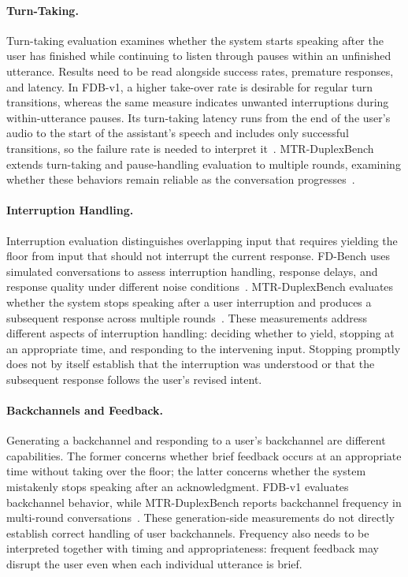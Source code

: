 \paragraph{Turn-Taking.}
Turn-taking evaluation examines whether the system starts speaking after the user has finished while continuing to listen through pauses within an unfinished utterance. Results need to be read alongside success rates, premature responses, and latency. In FDB-v1, a higher take-over rate is desirable for regular turn transitions, whereas the same measure indicates unwanted interruptions during within-utterance pauses. Its turn-taking latency runs from the end of the user's audio to the start of the assistant's speech and includes only successful transitions, so the failure rate is needed to interpret it~\citep{DBLP:conf/asru/LinLLWALL25}. MTR-DuplexBench extends turn-taking and pause-handling evaluation to multiple rounds, examining whether these behaviors remain reliable as the conversation progresses~\citep{DBLP:conf/acl/HeCXLZBMK26}.

\paragraph{Interruption Handling.}
Interruption evaluation distinguishes overlapping input that requires yielding the floor from input that should not interrupt the current response. FD-Bench uses simulated conversations to assess interruption handling, response delays, and response quality under different noise conditions~\citep{DBLP:conf/interspeech/PengCNMN0C25}. MTR-DuplexBench evaluates whether the system stops speaking after a user interruption and produces a subsequent response across multiple rounds~\citep{DBLP:conf/acl/HeCXLZBMK26}. These measurements address different aspects of interruption handling: deciding whether to yield, stopping at an appropriate time, and responding to the intervening input. Stopping promptly does not by itself establish that the interruption was understood or that the subsequent response follows the user's revised intent.

\paragraph{Backchannels and Feedback.}
Generating a backchannel and responding to a user's backchannel are different capabilities. The former concerns whether brief feedback occurs at an appropriate time without taking over the floor; the latter concerns whether the system mistakenly stops speaking after an acknowledgment. FDB-v1 evaluates backchannel behavior, while MTR-DuplexBench reports backchannel frequency in multi-round conversations~\citep{DBLP:conf/asru/LinLLWALL25,DBLP:conf/acl/HeCXLZBMK26}. These generation-side measurements do not directly establish correct handling of user backchannels. Frequency also needs to be interpreted together with timing and appropriateness: frequent feedback may disrupt the user even when each individual utterance is brief.


